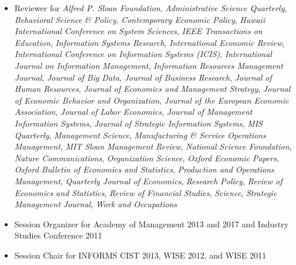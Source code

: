 \documentclass[10pt,letterpaper]{article}
\begin{document}
\begin{itemize}
\item Reviewer for
  \textit{Alfred P. Sloan Foundation},
  \textit{Administrative Science Quarterly},
  \textit{Behavioral Science \& Policy},
  \textit{Contemporary Economic Policy},
  \textit{Hawaii International Conference on System Sciences},
  \textit{IEEE Transactions on Education},
  \textit{Information Systems Research},
  \textit{International Economic Review},
  \textit{International Conference on Information Systems (ICIS)},
  \textit{International Journal on Information Management},
  \textit{Information Resources Management Journal},
  \textit{Journal of Big Data},
  \textit{Journal of Business Research},
  \textit{Journal of Human Resources},
  \textit{Journal of Economics and Management Strategy},
  \textit{Journal of Economic Behavior and Organization},
  \textit{Journal of the European Economic Association},
  \textit{Journal of Labor Economics},
  \textit{Journal of Management Information Systems},
  \textit{Journal of Strategic Information Systems},
  \textit{MIS Quarterly},
  \textit{Management Science},
  \textit{Manufacturing \& Service Operations Management},
  \textit{MIT Sloan Management Review},
  \textit{National Science Foundation},
  \textit{Nature Communications},
  \textit{Organization Science},
  \textit{Oxford Economic Papers},
  \textit{Oxford Bulletin of Economics and Statistics},
  \textit{Production and Operations Management},
  \textit{Quarterly Journal of Economics},
  \textit{Research Policy},
  \textit{Review of Economics and Statistics},
  \textit{Review of Financial Studies},
  \textit{Science},
  \textit{Strategic Management Journal},
  \textit{Work and Occupations}
  
 \item Session Organizer for Academy of Management 2013 and 2017 and Industry Studies Conference 2011
 \item Session Chair for INFORMS CIST 2013, WISE 2012, and WISE 2011
\end{itemize}  
 
\end{document}
